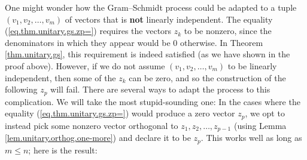 \documentclass[numbers=enddot,12pt,final,onecolumn,notitlepage]{scrartcl}%
\numberwithin{exer}{subsection}
\theoremstyle{definition}
\begin{document}
One might wonder how the Gram--Schmidt process could be adapted to a tuple
$\left(  v_{1},v_{2},\ldots,v_{m}\right)  $ of vectors that is \textbf{not}
linearly independent. The equality (\ref{eq.thm.unitary.gs.zp=}) requires the
vectors $z_{k}$ to be nonzero, since the denominators in which they appear
would be $0$ otherwise. In Theorem \ref{thm.unitary.gs}, this requirement is
indeed satisfied (as we have shown in the proof above). However, if we do not
assume $\left(  v_{1},v_{2},\ldots,v_{m}\right)  $ to be linearly independent,
then some of the $z_{k}$ can be zero, and so the construction of the following
$z_{p}$ will fail. There are several ways to adapt the process to this
complication. We will take the most stupid-sounding one: In the cases where
the equality (\ref{eq.thm.unitary.gs.zp=}) would produce a zero vector $z_{p}%
$, we opt to instead pick some nonzero vector orthogonal to $z_{1}%
,z_{2},\ldots,z_{p-1}$ (using Lemma \ref{lem.unitary.orthog.one-more}) and
declare it to be $z_{p}$. This works well as long as $m\leq n$; here is the result:
\end{document}
